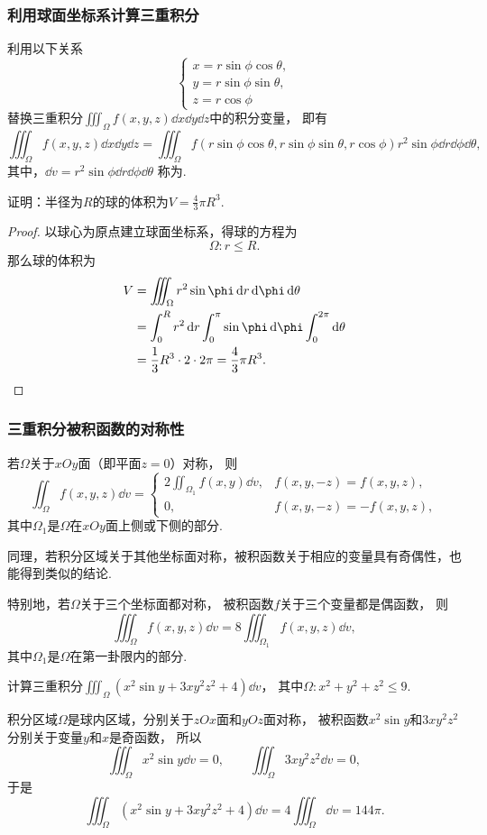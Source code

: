 \subsubsection{利用球面坐标系计算三重积分}
利用以下关系\[
	\left\{ \begin{array}{l}
		x = r \sin\phi \cos\theta, \\
		y = r \sin\phi \sin\theta, \\
		z = r \cos\phi
	\end{array} \right.
\]替换三重积分\(\iiint_\Omega{f(x,y,z)\dd{x}\dd{y}\dd{z}}\)中的积分变量，
即有\[
	\iiint_\Omega{f(x,y,z)\dd{x}\dd{y}\dd{z}}
	= \iiint_\Omega{f(r \sin\phi \cos\theta,r \sin\phi \sin\theta,r \cos\phi) r^2 \sin\phi \dd{r} \dd{\phi} \dd{\theta}},
\]
其中，\(\dd{v} = r^2 \sin\phi \dd{r} \dd{\phi} \dd{\theta}\)
称为.

\begin{example}
证明：半径为\(R\)的球的体积为\(V = \frac{4}{3} \pi R^3\).
\begin{proof}
以球心为原点建立球面坐标系，得球的方程为\[
	\Omega: r \leq R.
\]
那么球的体积为\begin{align*}
	V &= \iiint_\Omega r^2 \sin\phi \dd{r} \dd{\phi} \dd{\theta} \\
	&= \int_0^R r^2 \dd{r} \int_0^\pi \sin\phi \dd{\phi} \int_0^{2\pi} \dd{\theta} \\
	&= \frac{1}{3} R^3 \cdot 2 \cdot 2\pi
	= \frac{4}{3} \pi R^3.
	\qedhere
\end{align*}
\end{proof}
\end{example}

\subsubsection{三重积分被积函数的对称性}
若\(\Omega\)关于\(xOy\)面（即平面\(z=0\)）对称，
则\[
	\iint_\Omega f(x,y,z) \dd{v}
	= \left\{ \begin{array}{cc}
		2 \iint_{\Omega_1} f(x,y) \dd{v}, & f(x,y,-z) = f(x,y,z), \\
		0, & f(x,y,-z) = -f(x,y,z),
	\end{array} \right.
\]
其中\(\Omega_1\)是\(\Omega\)在\(xOy\)面上侧或下侧的部分.

同理，若积分区域关于其他坐标面对称，被积函数关于相应的变量具有奇偶性，也能得到类似的结论.

特别地，若\(\Omega\)关于三个坐标面都对称，
被积函数\(f\)关于三个变量都是偶函数，
则\[
	\iiint_\Omega f(x,y,z) \dd{v}
	= 8 \iiint_{\Omega_1} f(x,y,z) \dd{v},
\]
其中\(\Omega_1\)是\(\Omega\)在第一卦限内的部分.

\begin{example}
计算三重积分\(\iiint_\Omega (x^2 \sin y + 3xy^2z^2 + 4) \dd{v}\)，
其中\(\Omega: x^2+y^2+z^2\leq9\).
\begin{solution}
积分区域\(\Omega\)是球内区域，分别关于\(zOx\)面和\(yOz\)面对称，
被积函数\(x^2 \sin y\)和\(3xy^2z^2\)分别关于变量\(y\)和\(x\)是奇函数，
所以\[
	\iiint_\Omega x^2 \sin y \dd{v} = 0,
	\qquad
	\iiint_\Omega 3xy^2z^2 \dd{v} = 0,
\]
于是\[
	\iiint_\Omega (x^2 \sin y + 3xy^2z^2 + 4) \dd{v}
	= 4 \iiint_\Omega \dd{v}
	= 144 \pi.
\]
\end{solution}
\end{example}
